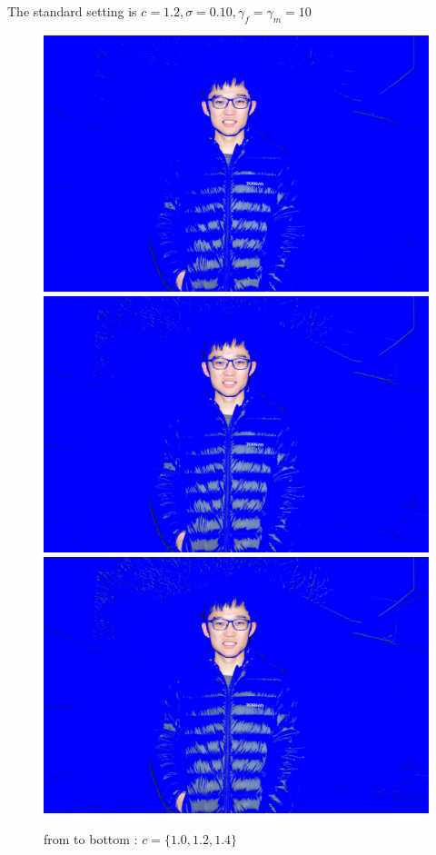 \documentclass[final]{cvpr}
\begin{document}
The standard setting is 
$c = 1.2, \sigma = 0.10, \gamma_f = \gamma_m = 10$


\begin{figure}[ht]
   \centering
   \includegraphics[scale=0.035]{../data/output/arthas_final_f_1.0_0.10_10_10.JPG}
   \includegraphics[scale=0.035]{../data/output/arthas_final_f_1.2_0.10_10_10.JPG}
   \includegraphics[scale=0.035]{../data/output/arthas_final_f_1.4_0.10_10_10.JPG}
   \caption{from to bottom : $ c = \{1.0,1.2,1.4\}$}
\end{figure}
\end{document}
